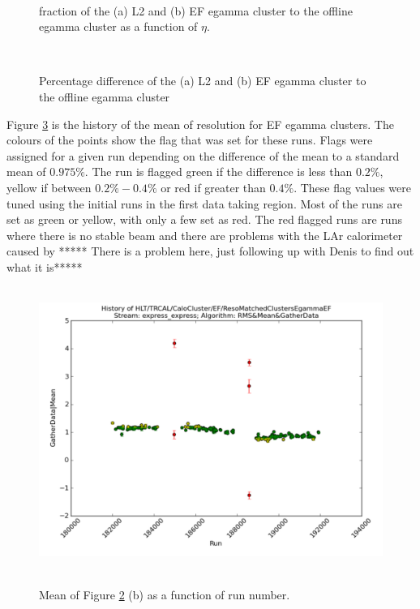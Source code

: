\begin{figure}
\centering
\mbox{
   \quad
      \quad
}
\caption[\et{} fraction of L2 and EF to offline egamma objects]{\et{} fraction of the (a) L2 and (b) EF egamma cluster to the offline egamma cluster \et{} as a function of $\eta$. \label{SW_egamma_L2EF_EtFrac}}
\end{figure}

\begin{figure}
\centering
\mbox{
   \quad
      \quad
}
\caption[Offline egamma \et{} versus L2/EF egamma \et{}]{Percentage difference of the (a) L2 and (b) EF egamma cluster \et{} to the offline egamma cluster \et{}\label{SW_egamma_L2EF_Reso}}
\end{figure}


Figure \ref{SW_egamma_EF_Reso_Range} is the history of the mean of \et{} resolution for EF egamma clusters.
The colours of the points show the flag that was set for these runs.
Flags were assigned for a given run depending on the difference of the mean to a standard mean of $0.975\%$. 
The run is flagged green if the difference is less than $0.2\%$, yellow if between $0.2\% - 0.4\%$ or red if greater than $0.4\%$.
These flag values were tuned using the initial runs in the first data taking region.
Most of the runs are set as green or yellow, with only a few set as red.
The red flagged runs are runs where there is no stable beam and there are problems with the LAr calorimeter caused by *****  There is a problem here, just following up with Denis to find out what it is*****

\begin{figure}
\centering
\mbox{
   \includegraphics[width=1.0\textwidth]{figures/ServiceWork/EF_Reso_Range.pdf}
}
\caption[Offline egamma \et{} versus L2/EF egamma \et{}]{Mean of Figure \ref{SW_egamma_L2EF_Reso} (b) as a function of run number. \label{SW_egamma_EF_Reso_Range}}
\end{figure}

